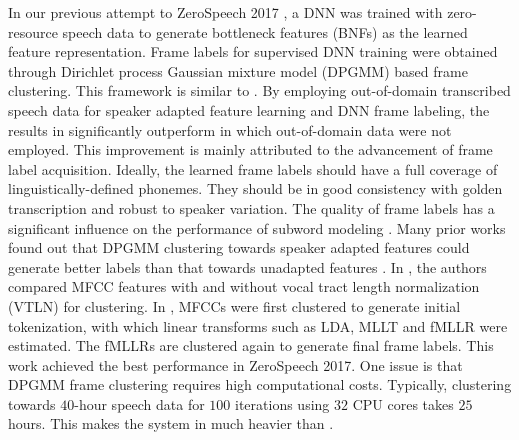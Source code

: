 \documentclass[a4paper]{article}
\begin{document}
In our previous attempt to ZeroSpeech 2017  \cite{Feng2018exploiting}, a  DNN was trained with   zero-resource speech data to generate bottleneck features (BNFs) as the learned feature representation. Frame labels for supervised DNN training were obtained through Dirichlet process Gaussian mixture model (DPGMM) based frame clustering. This framework is similar to \cite{chen2017multilingual}.
By employing  out-of-domain transcribed speech data for speaker adapted feature learning and DNN frame labeling, the results in \cite{Feng2018exploiting} significantly outperform  \cite{chen2017multilingual} in which out-of-domain data were not employed. 
This improvement is mainly attributed to the advancement of frame label acquisition.   
Ideally, the learned  frame labels should have a full coverage of linguistically-defined phonemes. They should be  in good consistency with golden transcription and  robust to speaker variation. The quality of frame labels has a significant influence on the performance of subword modeling \cite{heck2017feature}.
Many prior works found out that DPGMM clustering towards speaker adapted features could generate better labels than that towards unadapted features \cite{HeckSN16,heck2017feature,chen2017multilingual}. In \cite{chen2017multilingual}, the authors compared MFCC features with and without vocal tract length normalization (VTLN) for clustering. 
In \cite{heck2017feature}, MFCCs were first clustered to generate initial tokenization, with which  linear transforms such as LDA, MLLT and fMLLR  were estimated. The fMLLRs are clustered again to generate final frame labels. This work achieved the best performance in ZeroSpeech 2017. One issue is that DPGMM frame clustering requires high computational costs. Typically, clustering towards $40$-hour speech data for $100$ iterations using $32$ CPU cores takes $25$ hours. This makes the system in \cite{heck2017feature} much heavier than  \cite{chen2017multilingual,Feng2018exploiting}.
\end{document}
